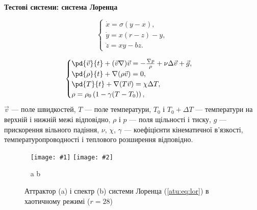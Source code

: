 \documentclass[14pt,handout,utf8]{beamer}
\newcommand{\Xhead}[1]{
 \begin{center}%
      \textbf{#1}%
 \end{center}%
}
\newcommand{\ABlbl}{%
  \vspace{-2.7ex}
  \begin{center}
    ~ \hfill a \hfill\hfill b \hfill ~
  \end{center}
  \vspace{-2.0ex}
}
\newcommand{\PicDouble}[2]{%
 \begin{center}
    ~ \hfill
    \texttt{[image: \#1]}
    \hfill
    \texttt{[image: \#2]}
    \hfill ~
  \end{center}
  \ABlbl
}
\begin{document}


\begin{frame}
  \frametitle{~}

  \Xhead{Тестові системи: система Лоренца}

  \begin{equation}
    \begin{cases}
      \dot{x} = \sigma (y-x ) , \\
      \dot{y} = x (r-z) - y , \\
      \dot{z} = x y - b z .
    \end{cases}
    \label{atu:eq:lor}
  \end{equation}

  \begin{equation}
    \begin{cases}
      \pd{\vec{v}}{t} + ( \vec{v} \nabla ) \vec{v} = - \frac{\nabla p}{\rho} + \nu \Delta \vec{v} + \vec{g}, \\
      \pd{\rho}{t} + \nabla ( \rho \vec{v} ) = 0 , \\
      \pd{T}{t} +\nabla ( T \vec{v} ) = \chi \Delta T , \\
      \rho = \rho_0 \left( 1 - \gamma (T - T_0) \right) ,
    \end{cases}
    \label{atu:eq:lor_gidro}
  \end{equation}
  $\Vec{v} $ --- поле швидкостей,
  $T $ --- поле температури,
  $T_0 $ і $ T_0 + \Delta T $ --- температури на верхній і нижній межі відповідно,
  $\rho $ і $ p $ --- поля щільності і тиску,
  $g $ --- прискорення вільного падіння,
  $\nu $,
  $\chi $,
  $\gamma $ --- коефіцієнти кінематичної в'язкості,
  температуропроводності і теплового розширення відповідно.

  \begin{figure}
    \PicDouble{../p5/p/cha/lor/lor0-p_xyz_r=028.png}{../p5/p/cha/lor/lor0_fft-p_f_r=028.png}
    \caption{Аттрактор (a) і спектр (b) системи Лоренца (\ref{atu:eq:lor}) в хаотичному режимі ($r = 28$)}
    \label{atu:f:lor_attractor_phase_chaos28}
  \end{figure}


\end{frame}

\end{document}
